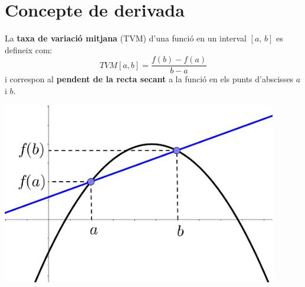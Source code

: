 
\section{Concepte de derivada}

\begin{theorybox}
	\begin{minipage}{0.6\textwidth}
		La \textbf{taxa de variació mitjana} (TVM) d'una funció en un interval $[a,\, b]$ es defineix com:
		\begin{equation*}
		TVM[a,b] = \frac{f(b)-f(a)}{b-a}
		\end{equation*}
		i correspon al \textbf{pendent de la recta secant} a la funció en els punts d'abscisses $a$ i $b$.
	\end{minipage}
	\begin{minipage}{0.38\textwidth}
		\centering\includegraphics[width=0.9\textwidth]{img-07/rectasecant}
	\end{minipage}
\end{theorybox}

